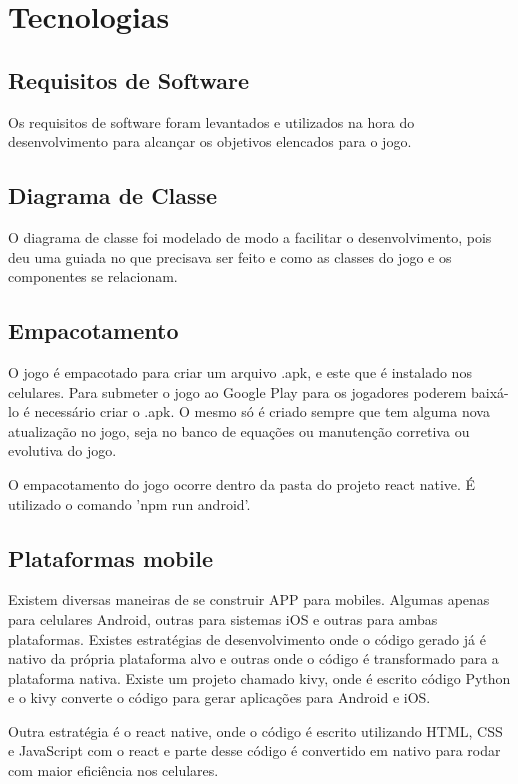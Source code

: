 \chapter[Tecnologias]{Tecnologias}

\section[Requisitos de Software]{Requisitos de Software}
Os requisitos de software foram levantados e utilizados na hora do desenvolvimento para alcançar os objetivos elencados para o jogo. 

\section[Diagrama de Classe]{Diagrama de Classe}
O diagrama de classe foi modelado de modo a facilitar o desenvolvimento, pois deu uma guiada no que precisava ser feito e como as classes do jogo e os componentes se relacionam. 

\section[Empacotamento]{Empacotamento}
O jogo é empacotado para criar um arquivo .apk, e este que é instalado nos celulares. Para submeter o jogo ao Google Play para os jogadores poderem baixá-lo é necessário criar o .apk. O mesmo só é criado sempre que tem alguma nova atualização no jogo, seja no banco de equações ou manutenção corretiva ou evolutiva do jogo.

O empacotamento do jogo ocorre dentro da pasta do projeto react native. É utilizado o comando 'npm run android'.


\section[Plataformas mobile]{Plataformas mobile}
Existem diversas maneiras de se construir APP para mobiles. Algumas apenas para celulares Android, outras para sistemas iOS e outras para ambas plataformas. Existes estratégias de desenvolvimento onde o código gerado já é nativo da própria plataforma alvo e outras onde o código é transformado para a plataforma nativa.
Existe um  projeto chamado kivy, onde é escrito código Python e o kivy converte o código para gerar aplicações para Android e iOS.

Outra estratégia é o react native, onde o código é escrito utilizando HTML, CSS e JavaScript com o react e parte desse código é convertido em nativo para rodar com maior eficiência nos celulares.

